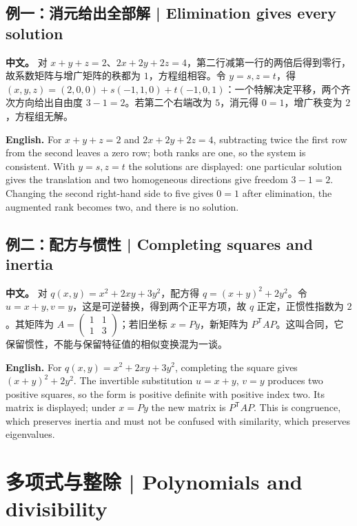 \documentclass[UTF8,11pt,a4paper]{ctexart}
\newcommand{\APS}[2]{\par\noindent\textbf{中文。} #1\par\noindent\textbf{English.} #2\par\smallskip}
\begin{document}
\subsection*{例一：消元给出全部解 | Elimination gives every solution}
\APS{对 $x+y+z=2$、$2x+2y+2z=4$，第二行减第一行的两倍后得到零行，故系数矩阵与增广矩阵的秩都为 $1$，方程组相容。令 $y=s,z=t$，得 $(x,y,z)=(2,0,0)+s(-1,1,0)+t(-1,0,1)$：一个特解决定平移，两个齐次方向给出自由度 $3-1=2$。若第二个右端改为 $5$，消元得 $0=1$，增广秩变为 $2$，方程组无解。}{For $x+y+z=2$ and $2x+2y+2z=4$, subtracting twice the first row from the second leaves a zero row; both ranks are one, so the system is consistent. With $y=s,z=t$ the solutions are displayed: one particular solution gives the translation and two homogeneous directions give freedom $3-1=2$. Changing the second right-hand side to five gives $0=1$ after elimination, the augmented rank becomes two, and there is no solution.}
\subsection*{例二：配方与惯性 | Completing squares and inertia}
\APS{对 $q(x,y)=x^2+2xy+3y^2$，配方得 $q=(x+y)^2+2y^2$。令 $u=x+y,v=y$，这是可逆替换，得到两个正平方项，故 $q$ 正定，正惯性指数为 $2$。其矩阵为 $A=\left(\begin{smallmatrix}1&1\\1&3\end{smallmatrix}\right)$；若旧坐标 $x=Py$，新矩阵为 $P^{\mathsf T}AP$。这叫合同，它保留惯性，不能与保留特征值的相似变换混为一谈。}{For $q(x,y)=x^2+2xy+3y^2$, completing the square gives $(x+y)^2+2y^2$. The invertible substitution $u=x+y$, $v=y$ produces two positive squares, so the form is positive definite with positive index two. Its matrix is displayed; under $x=Py$ the new matrix is $P^{\mathsf T}AP$. This is congruence, which preserves inertia and must not be confused with similarity, which preserves eigenvalues.}

\section{多项式与整除 | Polynomials and divisibility}
\end{document}
